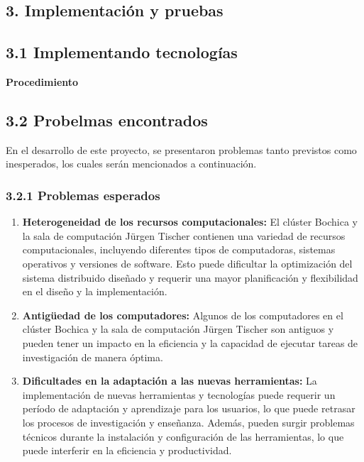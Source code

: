 \begin{doublespace}
\begin{tightcenter}
\section{3. Implementación y pruebas}
\mylinespacing
\end{tightcenter}

\begin{multicols}{2}
    \subsection{3.1 Implementando tecnologías}

\textbf{Procedimiento}

\subsection{3.2 Probelmas encontrados}
En el desarrollo de este proyecto, se presentaron problemas tanto previstos como inesperados, los cuales serán mencionados a continuación.

\subsubsection{3.2.1 Problemas esperados}

\begin{enumerate}
    \item \textbf{Heterogeneidad de los recursos computacionales:} El clúster Bochica y la sala de computación Jürgen Tischer contienen una variedad de recursos computacionales, incluyendo diferentes tipos de computadoras, sistemas operativos y versiones de software. Esto puede dificultar la optimización del sistema distribuido diseñado y requerir una mayor planificación y flexibilidad en el diseño y la implementación.
    \item \textbf{Antigüedad de los computadores:} Algunos de los computadores en el clúster Bochica y la sala de computación Jürgen Tischer son antiguos y pueden tener un impacto en la eficiencia y la capacidad de ejecutar tareas de investigación de manera óptima.
    \item \textbf{Dificultades en la adaptación a las nuevas herramientas:} La implementación de nuevas herramientas y tecnologías puede requerir un período de adaptación y aprendizaje para los usuarios, lo que puede retrasar los procesos de investigación y enseñanza. Además, pueden surgir problemas técnicos durante la instalación y configuración de las herramientas, lo que puede interferir en la eficiencia y productividad.
\end{enumerate}


\end{multicols}
\end{doublespace}
